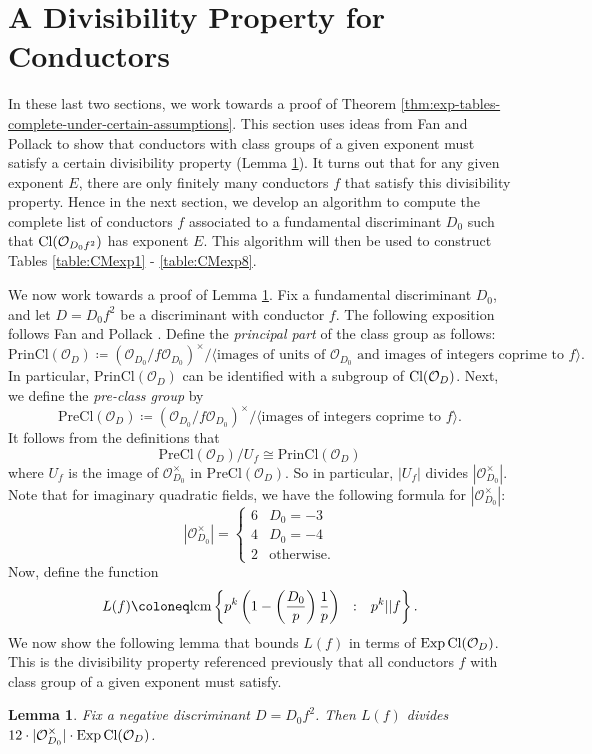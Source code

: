\documentclass[11pt,letterpaper,reqno]{amsart}
\newtheorem{lemma}[theorem]{Lemma}
\numberwithin{equation}{section}
\numberwithin{figure}{section}
\numberwithin{table}{section}
\newcommand{\lrp}[1]{\left(#1\right)}
\newcommand{\lrcb}[1]{\left\{#1\right\}}
\newcommand{\lcm}{\textnormal{lcm}}
\newcommand{\Or}[1]{\mathcal{O}_{#1}}
\newcommand{\Cl}[1]{\textnormal{Cl}(\mathcal{O}_{#1})}
\newcommand{\PrinCl}[1]{\text{PrinCl}(\mathcal{O}_{#1})}
\newcommand{\PreCl}[1]{\text{PreCl}(\mathcal{O}_{#1})}
\newcommand{\Exp}{\textnormal{Exp}\,}
\begin{document}


\section{A Divisibility Property for Conductors} \label{sec:property-of-conductors}

In these last two sections, we work towards a proof of Theorem \ref{thm:exp-tables-complete-under-certain-assumptions}. This section uses ideas from Fan and Pollack \cite{FanPollack} to show that conductors with class groups of a given exponent must satisfy a certain divisibility property (Lemma \ref{lem:property-of-f}). 
It turns out that for any given exponent $E$, there are only finitely many conductors $f$ that satisfy this divisibility property.
Hence in the next section, we develop an algorithm to compute the complete list of conductors $f$ associated to a fundamental discriminant $D_0$ such that $\Cl{D_0 f^2}$ has exponent $E$. This algorithm will then be used to construct Tables \ref{table:CMexp1} - \ref{table:CMexp8}. 



We now work towards a proof of Lemma \ref{lem:property-of-f}.
Fix a fundamental discriminant $D_0$, and let $D = D_0f^2$ be a discriminant with conductor $f$. The following exposition follows Fan and Pollack \cite{FanPollack}.
Define the \textit{principal part} of the class group as follows:
\[
    \PrinCl{D} \coloneq (\Or{D_0} / f\Or{D_0})^\times / \langle 
    \text{images of units of } \Or{D_0} \text{ and images of integers coprime to } f  \rangle.
\]
In particular, $\PrinCl{D}$ can be identified with a subgroup of $\Cl{D}$. Next, we define the \textit{pre-class group} by
\[
     \PreCl{D} \coloneq (\Or{D_0} / f\Or{D_0})^\times / \langle \text{images of integers coprime to } f \rangle.
\]
It follows from the definitions that
\begin{equation} \label{eqn:pre-prin-correspondance}
    \PreCl{D} / U_f \cong \PrinCl{D}
\end{equation}
where $U_f$ is the image of $\Or{D_0}^\times$ in $\PreCl{D}$. So in particular, $|U_f|$ divides $|\Or{D_0}^\times|$. Note that for imaginary quadratic fields, we have the following formula for $|\Or{D_0}^\times|$:
\[
    |\Or{D_0}^\times| = \begin{cases}
        6 & D_0 = -3 \\
        4 & D_0 = -4 \\
        2 & \text{otherwise}.
    \end{cases}
\]
Now, define the function
\[
    L(f) \coloneq \lcm\lrcb{ p^k\lrp{1 - \lrp{\frac{D_0}{p}} \frac{1}{p}} \ \  \colon\ \  p^k || f}.
\]
We now show the following lemma that bounds $L(f)$ in terms of $\Exp\Cl{D}$. 
This is the divisibility property referenced previously that all conductors $f$ with class group of a given exponent must satisfy.
\begin{lemma} \label{lem:property-of-f}
    Fix a negative discriminant $D = D_0f^2$. Then $L(f)$ divides $12\cdot |\Or{D_0}^\times| \cdot \Exp\Cl{D}$.
\end{lemma}
\end{document}
